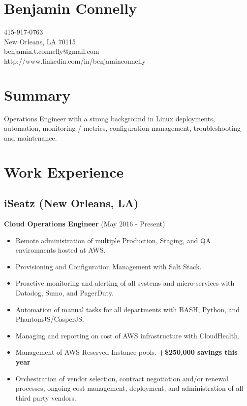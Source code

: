 \documentclass[]{article}
\date{}
\providecommand{\tightlist}{%
  \setlength{\itemsep}{0pt}\setlength{\parskip}{0pt}}
\begin{document}
\section{Benjamin Connelly}\label{benjamin-connelly}

415-917-0763\\
New Orleans, LA 70115\\
benjamin.t.connelly@gmail.com\\
http://www.linkedin.com/in/benjaminconnelly

\section{Summary}\label{summary}

Operations Engineer with a strong background in Linux deployments,
automation, monitoring / metrics, configuration management,
troubleshooting and maintenance.

\section{Work Experience}\label{work-experience}

\subsection{iSeatz (New Orleans, LA)}\label{iseatz-new-orleans-la}

\textbf{Cloud Operations Engineer} (May 2016 - Present)

\begin{itemize}
\tightlist
\item
  Remote administration of multiple Production, Staging, and QA
  environments hosted at AWS.
\item
  Provisioning and Configuration Management with Salt Stack.
\item
  Proactive monitoring and alerting of all systems and micro-services
  with Datadog, Sumo, and PagerDuty.
\item
  Automation of manual tasks for all departments with BASH, Python, and
  PhantomJS/CasperJS.
\item
  Managing and reporting on cost of AWS infrastructure with CloudHealth.
\item
  Management of AWS Reserved Instance pools. \textbf{+\$250,000 savings
  this year}
\item
  Orchestration of vendor selection, contract negotiation and/or renewal
  processes, ongoing cost management, deployment, and administration of
  all third party vendors.
\end{itemize}
\end{document}
